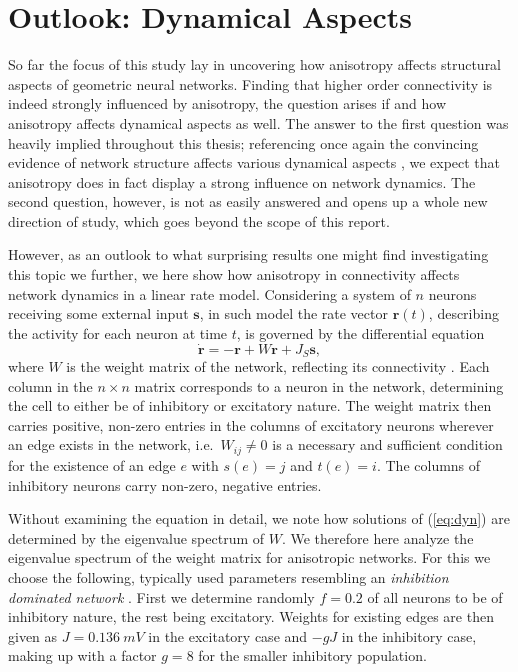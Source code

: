 \chapter{Outlook: Dynamical Aspects}\label{ch:dynamical_aspects}

So far the focus of this study lay in uncovering how anisotropy
affects structural aspects of geometric neural networks. Finding that
higher order connectivity is indeed strongly influenced by anisotropy,
the question arises if and how anisotropy affects dynamical aspects as
well. The answer to the first question was heavily implied throughout
this thesis; referencing once again the convincing evidence of network
structure affects various dynamical aspects \parencite{Pernice2011,
  Zhao2011}, we expect that anisotropy does in fact display a strong
influence on network dynamics. The second question, however, is not
as easily answered and opens up a whole new direction of study, which
goes beyond the scope of this report. 

However, as an outlook to what surprising results one might find
investigating this topic we further, we here show how anisotropy in
connectivity affects network dynamics in a linear rate
model. Considering a system of $n$ neurons receiving some external
input $\mathbf{s}$, in such  model the rate vector
$\mathbf{r}(t)$, describing the activity for each neuron at time $t$,
is governed by the differential equation
\begin{equation}
  \dot{\mathbf{r}}  = -\mathbf{r} + W\mathbf{r} + J_S \mathbf{s},
\label{eq:dyn}
\end{equation}
where $W$ is the weight matrix of the network, reflecting its
connectivity \parencite{Sadeh2014}. Each column in the $n \times n$
matrix corresponds to a neuron in the network, determining the cell to
either be of inhibitory or excitatory nature. The weight matrix
then carries positive, non-zero entries in the columns of excitatory
neurons wherever an edge exists in the network, i.e.\ $W_{ij} \neq
0$ is a necessary and sufficient condition for the existence of an
edge $e$ with $s(e) = j$ and $t(e) = i$. The columns of inhibitory
neurons carry non-zero, negative entries.

Without examining the equation in detail, we note how solutions of
(\ref{eq:dyn}) are determined by the eigenvalue spectrum of $W$. We
therefore here analyze the eigenvalue spectrum of the weight matrix
for anisotropic networks. For this we choose the following, typically
used parameters resembling an \textit{inhibition dominated
  network} \parencite{Brunel2000, Sadeh2014}. First we determine
randomly $f=0.2$ of all neurons to be of inhibitory nature, the rest
being excitatory. Weights for existing edges are then given as
$J=\SI{0.136}{mV}$ in the excitatory case and $-gJ$ in the inhibitory
case, making up with a factor $g=8$ for the smaller inhibitory population.


